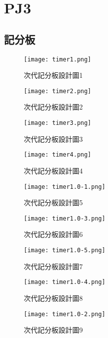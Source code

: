 \chapter{PJ3}


\section{記分板}


\begin{figure}
  \centering
  \texttt{[image: timer1.png]}
  \caption{次代記分板設計圖1}
  \label{fig:example}
\end{figure}

\begin{figure}
  \centering
  \texttt{[image: timer2.png]}
  \caption{次代記分板設計圖2}
  \label{fig:example}
\end{figure}


\begin{figure}
  \centering
  \texttt{[image: timer3.png]}
  \caption{次代記分板設計圖3}
  \label{fig:example}
\end{figure}


\begin{figure}
  \centering
  \texttt{[image: timer4.png]}
  \caption{次代記分板設計圖4}
  \label{fig:example}
\end{figure}


\begin{figure}
  \centering
  \texttt{[image: timer1.0-1.png]}
  \caption{次代記分板設計圖5}
  \label{fig:example}
\end{figure}


\begin{figure}
  \centering
  \texttt{[image: timer1.0-3.png]}
  \caption{次代記分板設計圖6}
  \label{fig:example}
\end{figure}


\begin{figure}
  \centering
  \texttt{[image: timer1.0-5.png]}
  \caption{次代記分板設計圖7}
  \label{fig:example}
\end{figure}


\begin{figure}
  \centering
  \texttt{[image: timer1.0-4.png]}
  \caption{次代記分板設計圖8}
  \label{fig:example}
\end{figure}


\begin{figure}
  \centering
  \texttt{[image: timer1.0-2.png]}
  \caption{次代記分板設計圖9}
  \label{fig:example}
\end{figure}



